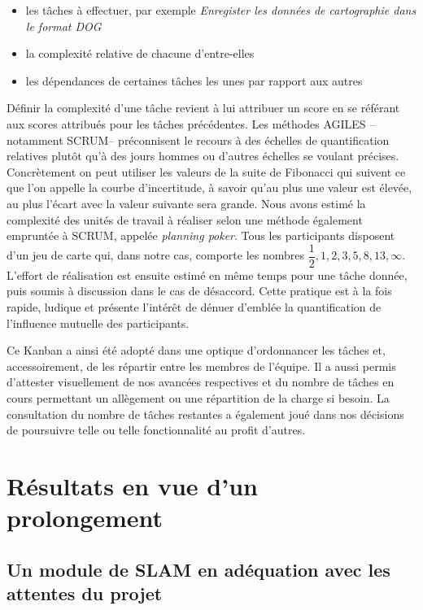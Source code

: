   \begin{itemize}
   \item les tâches à effectuer, par exemple \emph{Enregister les données de cartographie dans le format DOG}
   \item la complexité relative de chacune d'entre-elles 
   \item les dépendances de certaines tâches les unes par rapport aux autres
  \end{itemize}

  Définir la \og complexité \fg{} d'une tâche revient à lui attribuer un score en se référant aux scores attribués pour les tâches précédentes. 
  Les méthodes AGILES --notamment \gls{SCRUM}-- préconnisent le recours à des échelles de quantification relatives plutôt qu'à des jours hommes ou d'autres échelles se voulant précises. 
  Concrètement on peut utiliser les valeurs de la suite de Fibonacci qui suivent ce que l'on appelle la courbe d'incertitude, à savoir qu'au plus une valeur est élevée, au plus l'écart avec la valeur suivante sera grande. 
  Nous avons estimé la complexité des unités de travail à réaliser selon une méthode également empruntée à SCRUM, appelée \emph{planning poker}. 
  Tous les participants disposent d'un jeu de carte qui, dans notre cas, comporte les nombres $\dfrac{1}2, 1, 2, 3, 5, 8, 13, \infty$. 
  L'effort de réalisation est ensuite estimé en même temps pour une tâche donnée, puis soumis à discussion dans le cas de désaccord. 
  Cette pratique est à la fois rapide, ludique et présente l'intérêt de dénuer d'emblée la quantification de l'influence mutuelle des participants. 
  
  Ce Kanban a ainsi été adopté dans une optique d'ordonnancer les tâches et, accessoirement, de les répartir entre les membres de l'équipe. 
  Il a aussi permis d'attester visuellement de nos avancées respectives et du nombre de tâches en cours permettant un allègement ou une répartition de la charge si besoin.
  La consultation du nombre de tâches restantes a également joué dans nos décisions de poursuivre telle ou telle fonctionnalité au profit d'autres. 
  
\section{Résultats en vue d'un prolongement}  
  \subsection{Un module de SLAM en adéquation avec les attentes du projet}
  
